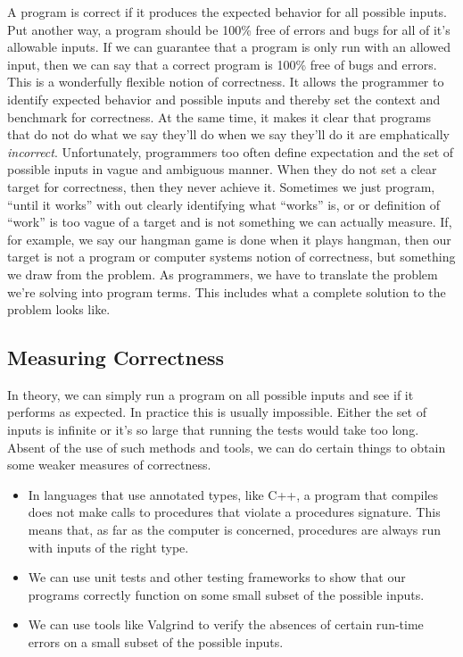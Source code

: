 \documentclass[]{tufte-handout}
\begin{document}
A program is correct if it produces the expected behavior for all possible inputs. Put another way, a program should be 100\% free of errors and bugs for all of it's allowable inputs. If we can guarantee that a program is only run with an allowed input, then we can say that a correct program is 100\% free of bugs and errors.  This is a wonderfully flexible notion of correctness. It allows the programmer to identify expected behavior and possible inputs and thereby set the context and benchmark for correctness. At the same time, it makes it clear that programs that do not do what we say they'll do when we say they'll do it are emphatically \textit{incorrect}.  Unfortunately, programmers too often define expectation and the set of possible inputs in vague and ambiguous manner.  When they do not set a clear target for correctness, then they never achieve it.  Sometimes we just program, ``until it works'' with out clearly identifying what ``works'' is, or or definition of ``work'' is too vague of a target and is not something we can actually measure.  If, for example, we say our hangman game is done when it plays hangman, then our target is not a program or computer systems notion of correctness, but something we draw from the problem. As programmers, we have to translate the problem we're solving into program terms. This includes what a complete solution to the problem looks like. 

\subsection{Measuring Correctness}

In theory, we can simply run a program on all possible inputs and see if it performs as expected.  In practice this is usually impossible. Either the set of inputs is infinite or it's so large that running the tests would take too long.  Absent of the use of such methods and tools, we can do certain things to obtain some weaker measures of correctness.
\begin{itemize}
\item In languages that use annotated types, like C++, a program that compiles does not make calls to procedures that violate a procedures signature.  This means that, as far as the computer is concerned, procedures are always run with inputs of the right type. 
\item We can use unit tests and other testing frameworks to show that our programs correctly function on some small subset of the possible inputs. 
\item We can use tools like Valgrind to verify the absences of certain run-time errors on a small subset of the possible inputs. 
\end{itemize}
\end{document}
